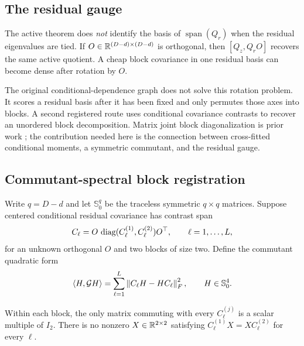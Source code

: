 \subsection{The residual gauge}

The active theorem does \emph{not} identify the basis of $\operatorname{span}(Q_r)$ when the residual eigenvalues are tied.  If $O\in\mathbb R^{(D-d)\times(D-d)}$ is orthogonal, then $[Q_z,Q_rO]$ recovers the same active quotient.  A cheap block covariance in one residual basis can become dense after rotation by $O$.

The original conditional-dependence graph does not solve this rotation problem.  It scores a residual basis after it has been fixed and only permutes those axes into blocks.  A second registered route uses conditional covariance contrasts to recover an unordered block decomposition.  Matrix joint block diagonalization is prior work \cite{cai-li-2021}; the contribution needed here is the connection between cross-fitted conditional moments, a symmetric commutant, and the residual gauge.

\subsection{Commutant-spectral block registration}

Write $q=D-d$ and let $\mathbb S^q_0$ be the traceless symmetric $q\times q$ matrices.  Suppose centered conditional residual covariance has contrast span
\begin{equation}
 C_\ell=O\,\operatorname{diag}(C_\ell^{(1)},C_\ell^{(2)})O^\top,
 \qquad \ell=1,\ldots,L,
 \label{eq:rotation-contrasts}
\end{equation}
for an unknown orthogonal $O$ and two blocks of size two.  Define the commutant quadratic form
\begin{equation}
 \left\langle H,\mathcal G H\right\rangle
 =\sum_{\ell=1}^L\left\lVert C_\ell H-HC_\ell\right\rVert_{F}^{2},
 \qquad H\in\mathbb S^4_0.
 \label{eq:commutant-gram}
\end{equation}

\begin{assumption}
Within each block, the only matrix commuting with every $C_\ell^{(j)}$ is a scalar multiple of $I_2$.  There is no nonzero $X\in\mathbb R^{2\times2}$ satisfying $C_\ell^{(1)}X=XC_\ell^{(2)}$ for every $\ell$.
\end{assumption}

